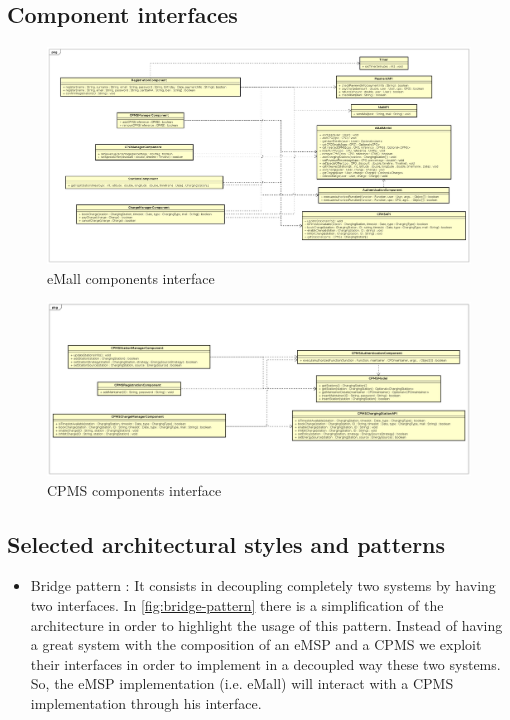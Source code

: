 \subsection{Component interfaces}
\begin{figure}[!h]
    \begin{center}
        \includegraphics[keepaspectratio, width=16cm]{Interface/eMallInterface.png}
        \caption{\ac{eMall} components interface}
        \label{fig:emall-interface}
    \end{center}
\end{figure}
\begin{figure}[!h]
    \begin{center}
        \includegraphics[keepaspectratio, width=16cm]{Interface/CPMSInterface.png}
        \caption{\ac{CPMS} components interface}
        \label{fig:emall-interface}
    \end{center}
\end{figure}
\clearpage

\subsection{Selected architectural styles and patterns}
\begin{itemize}
    \item Bridge pattern \cite{ref:bridge-pattern}: It consists in decoupling completely two systems by having two interfaces. In \autoref{fig:bridge-pattern} there is a simplification of the architecture in order to highlight the usage of this pattern.
          Instead of having a great system with the composition of an \ac{eMSP} and a \ac{CPMS} we exploit their interfaces in order to implement in a decoupled way these two systems. So, the \ac{eMSP} implementation (i.e. \ac{eMall}) will interact with a \ac{CPMS} implementation through his interface.
\end{itemize}

